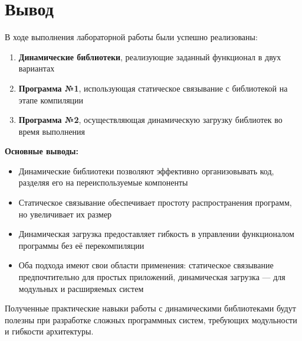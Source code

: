 \section{Вывод}

В ходе выполнения лабораторной работы были успешно реализованы:

\begin{enumerate}
    \item \textbf{Динамические библиотеки}, реализующие заданный функционал в двух вариантах
    \item \textbf{Программа №1}, использующая статическое связывание с библиотекой на этапе компиляции
    \item \textbf{Программа №2}, осуществляющая динамическую загрузку библиотек во время выполнения
\end{enumerate}

\textbf{Основные выводы:}

\begin{itemize}
    \item Динамические библиотеки позволяют эффективно организовывать код, разделяя его на переиспользуемые компоненты
    \item Статическое связывание обеспечивает простоту распространения программ, но увеличивает их размер
    \item Динамическая загрузка предоставляет гибкость в управлении функционалом программы без её перекомпиляции
    \item Оба подхода имеют свои области применения: статическое связывание предпочтительно для простых приложений, динамическая загрузка — для модульных и расширяемых систем
\end{itemize}

Полученные практические навыки работы с динамическими библиотеками будут полезны при разработке сложных программных систем, требующих модульности и гибкости архитектуры.

